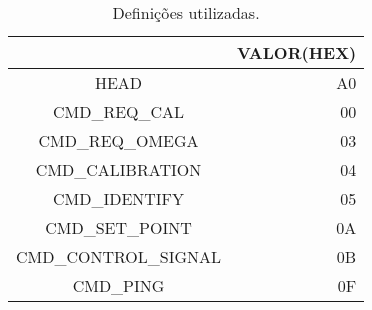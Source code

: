 \begin{table}[H]
\centering
\begin{tabular}{c|r}
\hline
\rowcolor[HTML]{C0C0C0} 
\multicolumn{1}{|c|}{\cellcolor[HTML]{C0C0C0}DEFINIÇÕES} & \multicolumn{1}{r|}{\cellcolor[HTML]{C0C0C0}VALOR(HEX)} \\ \hline
HEAD & A0 \\
\rowcolor[HTML]{EFEFEF} 
CMD\_REQ\_CAL & 00 \\
CMD\_REQ\_OMEGA & 03 \\
\rowcolor[HTML]{EFEFEF} 
CMD\_CALIBRATION & 04 \\
CMD\_IDENTIFY & 05 \\
\rowcolor[HTML]{EFEFEF} 
CMD\_SET\_POINT & 0A \\
CMD\_CONTROL\_SIGNAL & 0B \\
\rowcolor[HTML]{EFEFEF} 
CMD\_PING & 0F
\end{tabular}
\caption{Definições utilizadas.}
\label{tab:my-table}
\end{table}